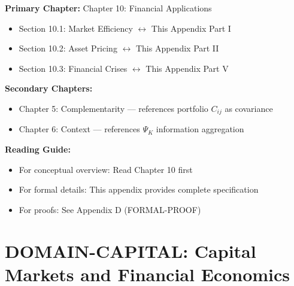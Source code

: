 \begin{tcolorbox}[colback=purple!5!white, colframe=purple!75!black,
    title=Chapter Linkage]

\textbf{Primary Chapter:} Chapter 10: Financial Applications
\begin{itemize}[nosep]
\item Section 10.1: Market Efficiency $\leftrightarrow$ This Appendix Part I
\item Section 10.2: Asset Pricing $\leftrightarrow$ This Appendix Part II
\item Section 10.3: Financial Crises $\leftrightarrow$ This Appendix Part V
\end{itemize}

\textbf{Secondary Chapters:}
\begin{itemize}[nosep]
\item Chapter 5: Complementarity --- references portfolio $C_{ij}$ as covariance
\item Chapter 6: Context --- references $\Psi_K$ information aggregation
\end{itemize}

\textbf{Reading Guide:}
\begin{itemize}[nosep]
\item For conceptual overview: Read Chapter 10 first
\item For formal details: This appendix provides complete specification
\item For proofs: See Appendix D (FORMAL-PROOF)
\end{itemize}

\end{tcolorbox}

\chapter{DOMAIN-CAPITAL: Capital Markets and Financial Economics}
\label{app:capital-markets}

\begin{abstract}
This appendix demonstrates how the EBF framework $(C, \Psi, C^*, K, Q)$ operates
in financial market contexts. Financial markets provide unique testing grounds:
rapid information aggregation ($\Psi_K \to P$), explicit complementarity structures
($C_{ij}^{portfolio}$ as covariances), coordination failures ($K \to 0$ in crises),
and measurable outcomes ($Q$ as returns, volatility, welfare). We integrate
20 foundational papers spanning efficient markets, asset pricing, behavioral
finance, corporate finance, banking crises, and derivatives. The synthesis
reveals how EBF unifies diverse financial phenomena under a common framework.
\end{abstract}

